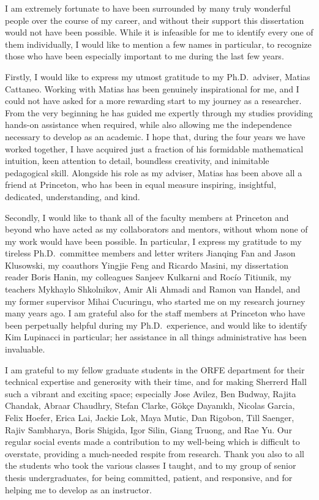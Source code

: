 
I am extremely fortunate to have been surrounded by many truly wonderful people
over the course of my career, and without their support this dissertation would
not have been possible. While it is infeasible for me to identify every one of
them individually, I would like to mention a few names in particular, to
recognize those who have been especially important to me during the last few
years.

Firstly, I would like to express my utmost gratitude to my Ph.D.\ adviser,
Matias Cattaneo. Working with Matias has been genuinely inspirational for me,
and I could not have asked for a more rewarding start to my journey as a
researcher. From the very beginning he has guided me expertly through my
studies providing hands-on assistance when required, while also allowing me the
independence necessary to develop as an academic. I hope that, during the four
years we have worked together, I have acquired just a fraction of his formidable
mathematical intuition, keen attention to detail, boundless creativity, and
inimitable pedagogical skill. Alongside his role as my adviser, Matias has been
above all a friend at Princeton, who has been in equal measure inspiring,
insightful, dedicated, understanding, and kind.

Secondly, I would like to thank all of the faculty members at Princeton and
beyond who have acted as my collaborators and mentors, without whom none of my
work would have been possible. In particular, I express my gratitude to my
tireless Ph.D.\ committee members and letter writers Jianqing Fan and Jason
Klusowski, my coauthors Yingjie Feng and Ricardo Masini, my dissertation reader
Boris Hanin, my colleagues Sanjeev Kulkarni and Roc{\'i}o Titiunik, my teachers
Mykhaylo Shkolnikov, Amir Ali Ahmadi and Ramon van Handel, and my former
supervisor Mihai Cucuringu, who started me on my research journey many years
ago. I am grateful also for the staff members at Princeton who have been
perpetually helpful during my Ph.D.\ experience, and would like to identify Kim
Lupinacci in particular; her assistance in all things administrative has been
invaluable.

I am grateful to my fellow graduate students in the ORFE department for their
technical expertise and generosity with their time, and for making Sherrerd
Hall such a vibrant and exciting space; especially Jose Avilez,
Ben Budway, Rajita Chandak,
Abraar Chaudhry, Stefan Clarke, G{\"o}k{\c c}e Dayan{\i}kl{\i}, Nicolas Garcia,
Felix Hoefer, Erica Lai, Jackie Lok, Maya Mutic, Dan Rigobon, Till Saenger,
Rajiv Sambharya, Boris Shigida, Igor Silin, Giang Truong, and Rae Yu. Our
regular social events made a contribution to my well-being which is difficult
to overstate, providing a much-needed respite from research. Thank you also to
all the students who took the various classes I taught, and to my group of
senior thesis undergraduates, for being committed, patient, and responsive, and
for helping me to develop as an instructor.

